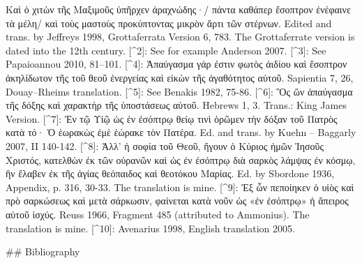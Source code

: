 Καὶ ὁ χιτὼν τῆς Μαξιμοῦς ὑπῆρχεν ἀραχνώδης·/ πάντα καθάπερ ἔσοπτρον ἐνέφαινε τὰ μέλη/ καὶ τοὺς μαστοὺς προκύπτοντας μικρὸν ἄρτι τῶν στέρνων. Edited and trans. by Jeffreys 1998, Grottaferrata Version 6, 783. The Grottaferrate version is dated into the 12th century.
[^2]: See for example Anderson 2007.
[^3]: See Papaioannou 2010, 81–101.
[^4]: Ἀπαύγασμα γάρ ἐστιν φωτὸς ἀιδίου καὶ ἔσοπτρον ἀκηλίδωτον τῆς τοῦ θεοῦ ἐνεργείας καὶ εἰκὼν τῆς ἀγαθότητος αὐτοῦ. Sapientia 7, 26, Douay–Rheims translation.
[^5]: See Benakis 1982, 75-86.
[^6]: Ὃς ὢν ἀπαύγασμα τῆς δόξης καὶ χαρακτὴρ τῆς ὑποστάσεως αὐτοῦ. Hebrews 1, 3. Trans.: King James Version.
[^7]: Ἐν τῷ Υἱῷ ὡς ἐν ἐσόπτρῳ θείῳ τινὶ ὁρῶμεν τὴν δόξαν τοῦ Πατρὸς κατὰ τό· Ὁ ἑωρακὼς ἐμὲ ἑώρακε τὸν Πατέρα. Ed. and trans. by Kuehn – Baggarly 2007, II 140-142.
[^8]: Ἀλλ’ ἡ σοφία τοῦ Θεοῦ, ἤγουν ὁ Κύριος ἡμῶν Ἰησοῦς Χριστός, κατελθὼν ἐκ τῶν οὐρανῶν καὶ ὡς ἐν ἐσόπτρῳ διὰ σαρκὸς λάμψας ἐν κόσμῳ, ἣν ἔλαβεν ἐκ τῆς ἁγίας θεόπαιδος καὶ θεοτόκου Μαρίας. Ed. by Sbordone 1936, Appendix, p. 316, 30-33. The translation is mine.
[^9]: Ἐξ ὧν πεποίηκεν ὁ υἱὸς καὶ πρὸ σαρκώσεως καὶ μετὰ σάρκωσιν, φαίνεται κατὰ νοῦν ὡς «ἐν ἐσόπτρῳ» ἡ ἄπειρος αὐτοῦ ἰσχύς. Reuss 1966, Fragment 485 (attributed to Ammonius). The translation is mine.
[^10]: Avenarius 1998, English translation 2005.

## Bibliography